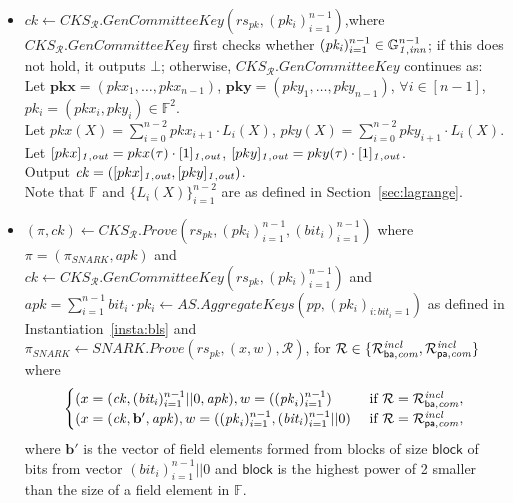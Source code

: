 \begin{construction}
\begin{itemize}
\item $\mathit{ck} \leftarrow \mathit{CKS_{\mathcal{R}}.GenCommitteeKey}(\mathit{rs_{pk}}, (\mathit{pk_i})_{i=1}^{n-1})$,where 
$\mathit{CKS_{\mathcal{R}}.GenCommitteeKey}$ first checks whether $(\mathit{pk_i})_{i=1}^{n-1} \in \mathbb{G}_{\mathit{1,inn}}^{n-1}$; if this does not hold, it outputs $\bot$;
otherwise, $\mathit{CKS_{\mathcal{R}}.GenCommitteeKey}$ continues as: \\
\noindent Let $\mathbf{pkx} = (\mathit{pkx_{1}}, \ldots, \mathit{pkx_{n-1}})$, $\mathbf{pky} = (\mathit{pky_{1}}, \ldots, \mathit{pky_{n-1}})$, $\forall i \in [n-1]$, $\mathit{pk_i} = (\mathit{pkx_i}, \mathit{pky_i}) \in \mathbb{F}^{2}$. \\
\noindent Let $pkx(X) = \sum_{i=0}^{n-2} \mathit{pkx_{i+1}} \cdot L_i(X)$, $pky(X) = \sum_{i=0}^{n-2} \mathit{pky_{i+1}} \cdot L_i(X)$. \\
\noindent Let $[pkx]_{\mathit{1,out}} = pkx(\tau) \cdot [1]_{\mathit{1,out}}$, $[pky]_{\mathit{1,out}} = pky(\tau) \cdot [1]_{\mathit{1,out}}$. \\
Output $\mathit{ck} = ([pkx]_{\mathit{1,out}}, [pky]_{\mathit{1,out}})$.\\
\noindent Note that $\mathbb{F}$ and $\{L_i(X)\}_{i=1}^{n-2}$ are as defined in Section~\ref{sec:lagrange}. 

\item $(\pi, \mathit{ck}) \leftarrow \mathit{CKS_{\mathcal{R}}.Prove}
(\mathit{rs}_{\mathit{pk}}, (\mathit{pk_i})_{i=1}^{n-1}, (\mathit{bit_i})_{i=1}^{n-1})$ 
where $ \pi = (\pi_{SNARK}, \mathit{apk})$ and \\
$\mathit{ck} \leftarrow \mathit{CKS_{\mathcal{R}}.GenCommitteeKey}(\mathit{rs_{pk}}, (\mathit{pk_i})_{i=1}^{n-1}) $ and \\
 $\mathit{apk} = \sum_{i=1}^{n-1} \mathit{bit_i} \cdot \mathit{pk_i} \leftarrow \mathit{AS.AggregateKeys}(\mathit{pp}, (\mathit{pk_i})_{i:\mathit{bit_i = 1}})$ 
as defined in Instantiation~\ref{insta:bls} and \\ $\pi_{SNARK} \leftarrow \mathit{SNARK.Prove}(\mathit{rs_{pk}}, (x,w), \mathcal{R})$, 
for $\mathcal{R} \in \{\mathcal{R}^{\mathit{incl}}_{\mathsf{ba},\mathit{com}}, \mathcal{R}^{\mathit{incl}}_{\mathsf{pa},\mathit{com}} \}$ where 
\begin{equation*}
\begin{cases}
 (x = (\mathit{ck}, (\mathit{bit_i})_{i=1}^{n-1}||0, \mathit{apk}), w = ((\mathit{pk}_i)_{i=1}^{n-1}) & \text{ if } \mathcal{R} = \mathcal{R}^{\mathit{incl}}_{\mathsf{ba},\mathit{com}},\\
 (x = (\mathit{ck}, \mathbf{b'}, \mathit{apk}), w = ((\mathit{pk}_i)_{i=1}^{n-1}, (\mathit{bit_i})_{i=1}^{n-1}||0) & \text{ if } \mathcal{R} = \mathcal{R}^{\mathit{incl}}_{\mathsf{pa},\mathit{com}}, \\
\end{cases}       
\end{equation*}
where $\mathbf{b'}$ is the vector of field elements formed from blocks of size $\mathsf{block}$ of bits from vector 
$(\mathit{bit_i})_{i=1}^{n-1}||0$ and $\mathsf{block}$ is the highest power of 2 smaller than the size of a field element in $\mathbb{F}$. 


\end{itemize}
\end{construction}

